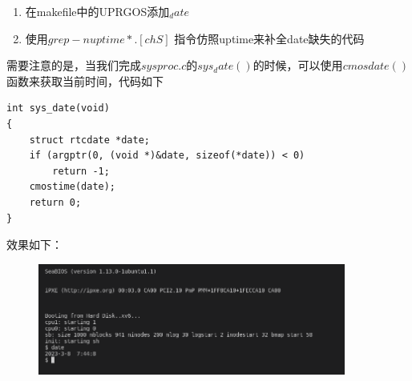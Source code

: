 \documentclass{article}
\begin{document}
\begin{enumerate}
    \item 在makefile中的UPRGOS添加$_date$
    \item 使用$grep -n uptime *.[chS]$ 指令仿照uptime来补全date缺失的代码
\end{enumerate}

需要注意的是，当我们完成$sysproc.c$的$sys_date()$的时候，可以使用$cmosdate()$函数来获取当前时间，代码如下

\begin{lstlisting}
int sys_date(void)
{
	struct rtcdate *date;
	if (argptr(0, (void *)&date, sizeof(*date)) < 0)
		return -1;
	cmostime(date);
	return 0;
}
\end{lstlisting}

效果如下：
\begin{figure}[H]
    \centering
    \includegraphics[width=0.9\textwidth]{figure/date_syscall.png}
\end{figure} 
\end{document}
